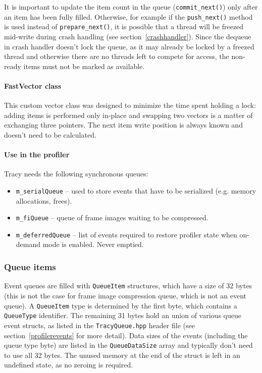 \documentclass[hidelinks,titlepage,a4paper]{article}
\begin{document}
It is important to update the item count in the queue (\texttt{commit\_next()}) only after an item has been fully filled. Otherwise, for example if the \texttt{push\_next()} method is used instead of \texttt{prepare\_next()}, it is possible that a thread will be freezed mid-write during crash handling (see section~\ref{crashhandler}). Since the dequeue in crash handler doesn't lock the queue, as it may already be locked by a freezed thread and otherwise there are no threads left to compete for access, the non-ready items must not be marked as available.

\paragraph{FastVector class}

This custom vector class was designed to minimize the time spent holding a lock: adding items is performed only in-place and swapping two vectors is a matter of exchanging three pointers. The next item write position is always known and doesn't need to be calculated.

\paragraph{Use in the profiler}

Tracy needs the following synchronous queues:

\begin{itemize}
\item \texttt{m\_serialQueue} -- used to store events that have to be serialized (e.g. memory allocations, frees).
\item \texttt{m\_fiQueue} -- queue of frame images waiting to be compressed.
\item \texttt{m\_deferredQueue} -- list of events required to restore profiler state when on-demand mode is enabled. Never emptied.
\end{itemize}

\subsubsection{Queue items}
\label{queueitems}

Event queues are filled with \texttt{QueueItem} structures, which have a size of 32 bytes (this is not the case for frame image compression queue, which is not an event queue). A \texttt{QueueItem} type is determined by the first byte, which contains a \texttt{QueueType} identifier. The remaining 31 bytes hold an union of various queue event structs, as listed in the \texttt{TracyQueue.hpp} header file (see section~\ref{profilerevents} for more detail). Data sizes of the events (including the queue type byte) are listed in the \texttt{QueueDataSize} array and typically don't need to use all 32 bytes. The unused memory at the end of the struct is left in an undefined state, as no zeroing is required.
\end{document}
